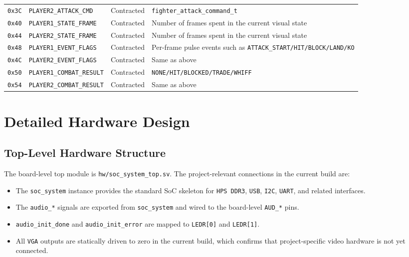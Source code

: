 \documentclass[12pt,a4paper]{article}
\begin{document}
\begin{longtable}{>{\raggedright\arraybackslash}p{} >{\raggedright\arraybackslash}p{} >{\raggedright\arraybackslash}p{} >{\raggedright\arraybackslash}p{}}
\texttt{0x3C} & \texttt{PLAYER2\_ATTACK\_CMD} & Contracted & \texttt{fighter\_attack\_command\_t} \\
\texttt{0x40} & \texttt{PLAYER1\_STATE\_FRAME} & Contracted & Number of frames spent in the current visual state \\
\texttt{0x44} & \texttt{PLAYER2\_STATE\_FRAME} & Contracted & Number of frames spent in the current visual state \\
\texttt{0x48} & \texttt{PLAYER1\_EVENT\_FLAGS} & Contracted & Per-frame pulse events such as \texttt{ATTACK\_START/HIT/BLOCK/LAND/KO} \\
\texttt{0x4C} & \texttt{PLAYER2\_EVENT\_FLAGS} & Contracted & Same as above \\
\texttt{0x50} & \texttt{PLAYER1\_COMBAT\_RESULT} & Contracted & \texttt{NONE/HIT/BLOCKED/TRADE/WHIFF} \\
\texttt{0x54} & \texttt{PLAYER2\_COMBAT\_RESULT} & Contracted & Same as above \\
\bottomrule
\end{longtable}

\section{Detailed Hardware Design}

\subsection{Top-Level Hardware Structure}

The board-level top module is \texttt{hw/soc\_system\_top.sv}. The project-relevant connections in the current build are:

\begin{itemize}
  \item The \texttt{soc\_system} instance provides the standard SoC skeleton for \texttt{HPS DDR3}, \texttt{USB}, \texttt{I2C}, \texttt{UART}, and related interfaces.
  \item The \texttt{audio\_*} signals are exported from \texttt{soc\_system} and wired to the board-level \texttt{AUD\_*} pins.
  \item \texttt{audio\_init\_done} and \texttt{audio\_init\_error} are mapped to \texttt{LEDR[0]} and \texttt{LEDR[1]}.
  \item All \texttt{VGA} outputs are statically driven to zero in the current build, which confirms that project-specific video hardware is not yet connected.
\end{itemize}
\end{document}
